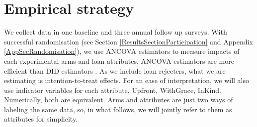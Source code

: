 \section{Empirical strategy}
\label{SecEmpiricalStrategy}


	We collect data in one baseline and three annual follow up surveys. With successful randomisation (see Section \ref{ResultsSectionParticipation} and Appendix \ref{AppSecRandomisation}), we use ANCOVA estimators to measure impacts of each experimental arms and loan attributes. ANCOVA estimators are more efficient than DID estimators \citep{FrisonPocock1992, McKenzie2012}. As we include loan rejecters, what we are estimating is intention-to-treat effects. For an ease of interpretation, we will also use indicator variables for each attribute, \textsf{Upfront, WithGrace, InKind}. Numerically, both are equivalent. Arms and attributes are just two ways of labeling the same data, so, in what follows, we will jointly refer to them as attributes for simplicity.
	
